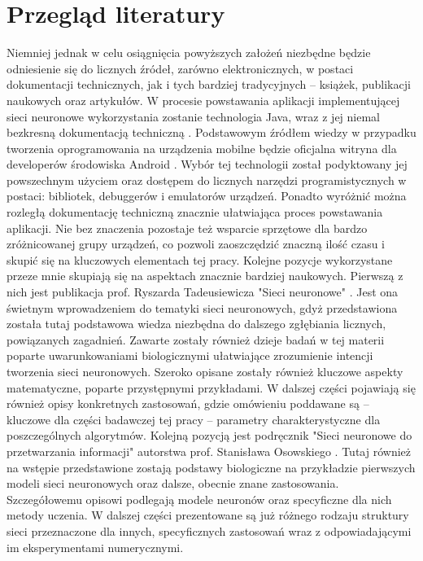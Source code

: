 \section{Przegląd literatury}

Niemniej jednak w celu osiągnięcia powyższych założeń niezbędne będzie odniesienie się do licznych źródeł, zarówno elektronicznych, w postaci dokumentacji technicznych, jak i tych bardziej tradycyjnych -- książek, publikacji naukowych oraz artykułów. W procesie powstawania aplikacji implementującej sieci neuronowe wykorzystania zostanie technologia Java, wraz z jej niemal bezkresną dokumentacją techniczną \cite{java}. Podstawowym źródłem wiedzy w przypadku tworzenia oprogramowania na urządzenia mobilne będzie oficjalna witryna dla developerów środowiska Android \cite{android}. Wybór tej technologii został podyktowany jej powszechnym użyciem oraz dostępem do licznych narzędzi programistycznych w postaci: bibliotek, debuggerów i emulatorów urządzeń. Ponadto wyróżnić można rozległą dokumentację techniczną znacznie ułatwiająca proces powstawania aplikacji. Nie bez znaczenia pozostaje też wsparcie sprzętowe dla bardzo zróżnicowanej grupy urządzeń, co pozwoli zaoszczędzić znaczną ilość czasu i skupić się na kluczowych elementach tej pracy. Kolejne pozycje wykorzystane przeze mnie skupiają się na aspektach znacznie bardziej naukowych. Pierwszą z nich jest publikacja prof. Ryszarda Tadeusiewicza "Sieci neuronowe" \cite{Tad93}. Jest ona świetnym wprowadzeniem do tematyki sieci neuronowych, gdyż przedstawiona została tutaj podstawowa wiedza niezbędna do dalszego zgłębiania licznych, powiązanych zagadnień. Zawarte zostały również dzieje badań w tej materii poparte uwarunkowaniami biologicznymi ułatwiające zrozumienie intencji tworzenia sieci neuronowych. Szeroko opisane zostały również kluczowe aspekty matematyczne, poparte przystępnymi przykładami. W dalszej części pojawiają się również opisy konkretnych zastosowań, gdzie omówieniu poddawane są -- kluczowe dla części badawczej tej pracy -- parametry charakterystyczne dla poszczególnych algorytmów. Kolejną pozycją jest podręcznik "Sieci neuronowe do przetwarzania informacji" autorstwa prof. Stanisława Osowskiego \cite{Oso06}. Tutaj również na wstępie przedstawione zostają podstawy biologiczne na przykładzie pierwszych modeli sieci neuronowych oraz dalsze, obecnie znane zastosowania. Szczegółowemu opisowi podlegają modele neuronów oraz specyficzne dla nich metody uczenia. W dalszej części prezentowane są już różnego rodzaju struktury sieci przeznaczone dla innych, specyficznych zastosowań wraz z odpowiadającymi im eksperymentami numerycznymi.
